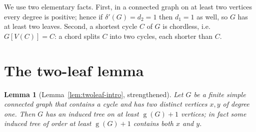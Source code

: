 \documentclass[11pt]{article}
\numberwithin{equation}{section}
\newtheorem{lemma}[theorem]{Lemma}
\theoremstyle{remark}
\newcommand{\gr}{\operatorname{g}}
\newcommand{\dd}{\delta'}
\begin{document}
We use two elementary facts.  First, in a connected graph on at least two
vertices every degree is positive; hence if $\dd(G)=d_2=1$ then $d_1=1$ as
well, so $G$ has at least two leaves.  Second, a shortest cycle $C$ of $G$ is
chordless, i.e.\ $G[V(C)]=C$: a chord splits $C$ into two cycles, each shorter
than $C$.

\section{The two-leaf lemma}

\begin{lemma}[Lemma~\ref{lem:twoleaf-intro}, strengthened]\label{lem:twoleaf}
Let $G$ be a finite simple connected graph that contains a cycle and has two
distinct vertices $x,y$ of degree one.  Then $G$ has an induced tree on at
least $\gr(G)+1$ vertices; in fact some induced tree of order at least
$\gr(G)+1$ contains both $x$ and $y$.
\end{lemma}
\end{document}
